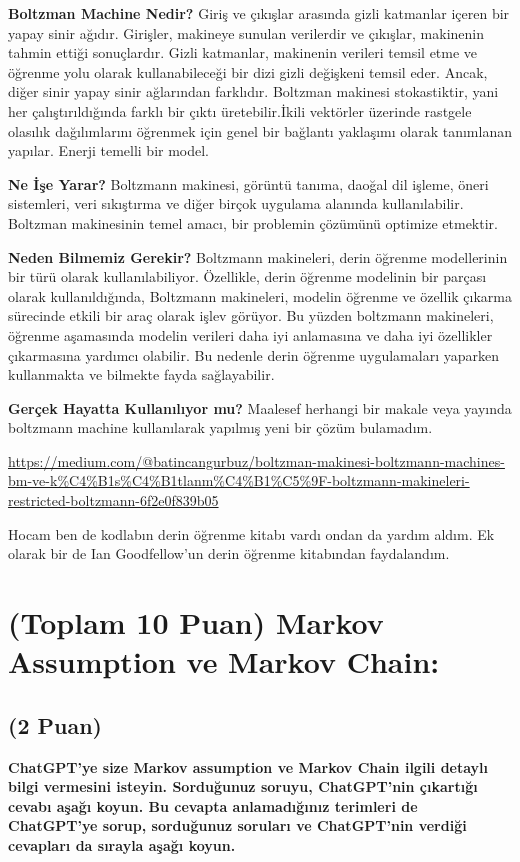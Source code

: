 \documentclass[11pt]{article}
\begin{document}
\textbf{Boltzman Machine Nedir?}
Giriş ve çıkışlar arasında gizli katmanlar içeren bir yapay sinir ağıdır. Girişler, makineye sunulan verilerdir ve çıkışlar, makinenin tahmin ettiği sonuçlardır. Gizli katmanlar, makinenin verileri temsil etme ve öğrenme yolu olarak kullanabileceği bir dizi gizli değişkeni temsil eder. Ancak, diğer sinir yapay sinir ağlarından farklıdır. Boltzman makinesi stokastiktir, yani her çalıştırıldığında farklı bir çıktı üretebilir.İkili vektörler üzerinde rastgele olasılık dağılımlarını öğrenmek için genel bir bağlantı yaklaşımı olarak tanımlanan yapılar. Enerji temelli bir model. 

\textbf{Ne İşe Yarar?}
Boltzmann makinesi, görüntü tanıma, daoğal dil işleme, öneri sistemleri, veri sıkıştırma ve diğer birçok uygulama alanında kullanılabilir. Boltzman makinesinin temel amacı, bir problemin çözümünü optimize etmektir.

\textbf{Neden Bilmemiz Gerekir?}
 Boltzmann makineleri, derin öğrenme modellerinin bir türü olarak kullanılabiliyor. Özellikle, derin öğrenme modelinin bir parçası olarak kullanıldığında, Boltzmann makineleri, modelin öğrenme ve özellik çıkarma sürecinde etkili bir araç olarak işlev görüyor. Bu yüzden boltzmann makineleri, öğrenme aşamasında modelin verileri daha iyi anlamasına ve daha iyi özellikler çıkarmasına yardımcı olabilir. Bu nedenle derin öğrenme uygulamaları yaparken kullanmakta ve bilmekte fayda sağlayabilir.
 
 \textbf{Gerçek Hayatta Kullanılıyor mu?}
 Maalesef herhangi bir makale veya yayında boltzmann machine kullanılarak yapılmış yeni bir çözüm bulamadım.
 
 \url{https://medium.com/@batincangurbuz/boltzman-makinesi-boltzmann-machines-bm-ve-k%C4%B1s%C4%B1tlanm%C4%B1%C5%9F-boltzmann-makineleri-restricted-boltzmann-6f2e0f839b05}
 
 Hocam ben de kodlabın derin öğrenme kitabı vardı ondan da yardım aldım. Ek olarak bir de Ian Goodfellow'un derin öğrenme kitabından faydalandım.

\section{(Toplam 10 Puan) Markov Assumption ve Markov Chain:}

\subsection{(2 Puan)} \textbf{ChatGPT’ye size Markov assumption ve Markov Chain ilgili detaylı bilgi vermesini isteyin. Sorduğunuz soruyu, ChatGPT'nin çıkartığı cevabı aşağı koyun. Bu cevapta anlamadığınız terimleri de ChatGPT’ye sorup, sorduğunuz soruları ve ChatGPT’nin verdiği cevapları da sırayla aşağı koyun.}
\end{document}
